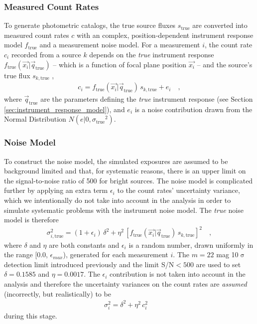 \documentclass[preprint,pdftex]{aastex}
\newcommand{\true}{\text{true}}
\begin{document}
\subsubsection{Measured Count Rates}
To generate photometric catalogs, the true source fluxes $s_\true$ are converted into measured count rates $c$ with an complex, position-dependent instrument response model $f_\true$ and a measurement noise model. For a measurement $i$, the count rate $c_i$ recorded from a source $k$ depends on the \textit{true} instrument response $f_{\true}(\vec{x_i} | \vec{q}_\true)$ -- which is a function of focal plane position $\vec{x_i}$ -- and the source's true flux $s_{k,\true}$ ,
\begin{eqnarray*}
c_i = f_{\true}(\vec{x_i} | \vec{q}_\true) \, s_{k, \true} + e_{i} \quad ,
\end{eqnarray*}
where $\vec{q}_\true$ are the parameters defining the \textit{true} instrument response (see Section \ref{sec:instrument_response_model}), and $e_i$ is a noise contribution drawn from the Normal Distribution $N(e|0,{\sigma_\true}^2)$. 

\subsubsection{Noise Model}
\label{sec:noise}
To construct the noise model, the simulated exposures are assumed to be background limited and that, for systematic reasons, there is an upper limit on the signal-to-noise ratio of 500 for bright sources. The noise model is complicated further by applying an extra term $\epsilon_i$ to the count rates' uncertainty variance, which we intentionally do not take into account in the analysis in order to simulate systematic problems with the instrument noise model. The \textit{true} noise model is therefore
\begin{eqnarray}
\sigma_{i, \true}^{2} = (1 + \epsilon_i) \, \delta^{2} + \eta^{2}\, [ f_\true(\vec{x_i} | \vec{q}_\true) \, s_{k, \true} ]^2 \quad , \label{eqn:noise}
\end{eqnarray}
where $\delta$ and $\eta$ are both constants and $\epsilon_i$ is a random number, drawn uniformly in the range [0.0, $\epsilon_{max}$), generated for each measurement $i$. The $m = 22$ mag 10$\upsigma$ detection limit introduced previously and the limit S/N$<500$ are used to set $\delta = 0.1585$ and $\eta = 0.0017$. The $\epsilon_i$ contribution is not taken into account in the analysis and therefore the uncertainty variances on the count rates are \textit{assumed} (incorrectly, but realistically) to be
\begin{eqnarray*}
\sigma_{{i}}^{2} = \delta^{2} + \eta^{2} \, c^{2}_i \quad 
\end{eqnarray*}
during this stage. 
\end{document}
